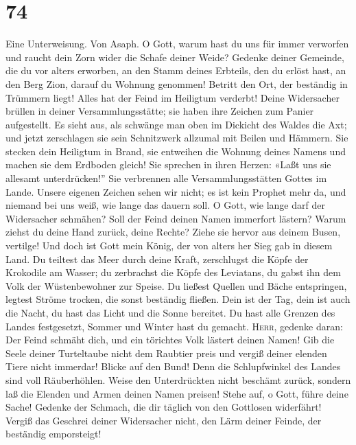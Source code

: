 \hypertarget{section-73}{%
\section{74}\label{section-73}}

 Eine Unterweisung. Von Asaph. O Gott, warum hast du uns
für immer verworfen und raucht dein Zorn wider die Schafe deiner Weide?
 Gedenke deiner Gemeinde, die du vor alters erworben, an
den Stamm deines Erbteils, den du erlöst hast, an den Berg Zion, darauf
du Wohnung genommen!  Betritt den Ort, der beständig in
Trümmern liegt! Alles hat der Feind im Heiligtum verderbt!
 Deine Widersacher brüllen in deiner Versammlungsstätte;
sie haben ihre Zeichen zum Panier aufgestellt.  Es sieht
aus, als schwänge man oben im Dickicht des Waldes die Axt;
 und jetzt zerschlagen sie sein Schnitzwerk allzumal mit
Beilen und Hämmern.  Sie stecken dein Heiligtum in Brand,
sie entweihen die Wohnung deines Namens und machen sie dem Erdboden
gleich!  Sie sprechen in ihren Herzen: «Laßt uns sie
allesamt unterdrücken!'' Sie verbrennen alle Versammlungsstätten Gottes
im Lande.  Unsere eigenen Zeichen sehen wir nicht; es ist
kein Prophet mehr da, und niemand bei uns weiß, wie lange das dauern
soll.  O Gott, wie lange darf der Widersacher schmähen?
Soll der Feind deinen Namen immerfort lästern?  Warum
ziehst du deine Hand zurück, deine Rechte? Ziehe sie hervor aus deinem
Busen, vertilge!  Und doch ist Gott mein König, der von
alters her Sieg gab in diesem Land.  Du teiltest das Meer
durch deine Kraft, zerschlugst die Köpfe der Krokodile am Wasser;
 du zerbrachst die Köpfe des Leviatans, du gabst ihn dem
Volk der Wüstenbewohner zur Speise.  Du ließest Quellen
und Bäche entspringen, legtest Ströme trocken, die sonst beständig
fließen.  Dein ist der Tag, dein ist auch die Nacht, du
hast das Licht und die Sonne bereitet.  Du hast alle
Grenzen des Landes festgesetzt, Sommer und Winter hast du gemacht.
 \textsc{Herr}, gedenke daran: Der Feind schmäht dich,
und ein törichtes Volk lästert deinen Namen!  Gib die
Seele deiner Turteltaube nicht dem Raubtier preis und vergiß deiner
elenden Tiere nicht immerdar!  Blicke auf den Bund! Denn
die Schlupfwinkel des Landes sind voll Räuberhöhlen. 
Weise den Unterdrückten nicht beschämt zurück, sondern laß die Elenden
und Armen deinen Namen preisen!  Stehe auf, o Gott, führe
deine Sache! Gedenke der Schmach, die dir täglich von den Gottlosen
widerfährt!  Vergiß das Geschrei deiner Widersacher
nicht, den Lärm deiner Feinde, der beständig emporsteigt!

